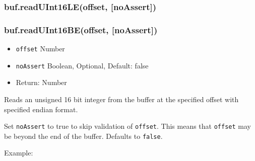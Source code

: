 \begin{Shaded}
\begin{Highlighting}[]
  \NormalTok{(}\NormalTok{);}

\NormalTok{buf[}\NormalTok{] = }\NormalTok{;}
\NormalTok{buf[}\NormalTok{] = }\NormalTok{;}
\NormalTok{buf[}\NormalTok{] = }\NormalTok{;}
\NormalTok{buf[}\NormalTok{] = }\NormalTok{;}

 
  \NormalTok{(}
\NormalTok{\}}

\end{Highlighting}
\end{Shaded}

\subsubsection{buf.readUInt16LE(offset,
{[}noAssert{]})}\label{buf.readuint16leoffset-noassert}

\subsubsection{buf.readUInt16BE(offset,
{[}noAssert{]})}\label{buf.readuint16beoffset-noassert}

\begin{itemize}
\itemsep1pt\parskip0pt
\item
  \texttt{offset} Number
\item
  \texttt{noAssert} Boolean, Optional, Default: false
\item
  Return: Number
\end{itemize}

Reads an unsigned 16 bit integer from the buffer at the specified offset
with specified endian format.

Set \texttt{noAssert} to true to skip validation of \texttt{offset}.
This means that \texttt{offset} may be beyond the end of the buffer.
Defaults to \texttt{false}.

Example:

